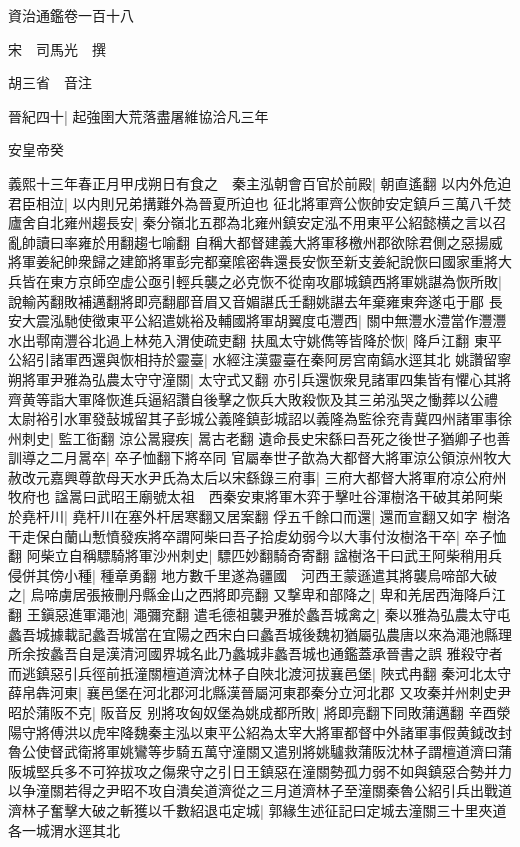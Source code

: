 資治通鑑卷一百十八

宋　司馬光　撰

胡三省　音注

晉紀四十|{
	起強圉大荒落盡屠維協洽凡三年}


安皇帝癸

義熙十三年春正月甲戌朔日有食之　秦主泓朝會百官於前殿|{
	朝直遙翻}
以内外危迫君臣相泣|{
	以内則兄弟搆難外為晉夏所迫也}
征北將軍齊公恢帥安定鎮戶三萬八千焚廬舍自北雍州趨長安|{
	秦分嶺北五郡為北雍州鎮安定泓不用東平公紹懿横之言以召亂帥讀曰率雍於用翻趨七喻翻}
自稱大都督建義大將軍移檄州郡欲除君側之惡揚威將軍姜紀帥衆歸之建節將軍彭完都棄隂密犇還長安恢至新支姜紀說恢曰國家重將大兵皆在東方京師空虚公亟引輕兵襲之必克恢不從南攻郿城鎮西將軍姚諶為恢所敗|{
	說輸芮翻敗補邁翻將即亮翻郿音眉又音媚諶氏壬翻姚諶去年棄雍東奔遂屯于郿}
長安大震泓馳使徵東平公紹遣姚裕及輔國將軍胡翼度屯灃西|{
	關中無灃水澧當作灃灃水出鄠南灃谷北過上林苑入渭使疏吏翻}
扶風太守姚儁等皆降於恢|{
	降戶江翻}
東平公紹引諸軍西還與恢相持於靈臺|{
	水經注漢靈臺在秦阿房宫南鎬水逕其北}
姚讚留寧朔將軍尹雅為弘農太守守潼關|{
	太守式又翻}
亦引兵還恢衆見諸軍四集皆有懼心其將齊黄等詣大軍降恢進兵逼紹讚自後擊之恢兵大敗殺恢及其三弟泓哭之慟葬以公禮　太尉裕引水軍發鼔城留其子彭城公義隆鎮彭城詔以義隆為監徐兖青冀四州諸軍事徐州刺史|{
	監工衘翻}
涼公暠寢疾|{
	暠古老翻}
遺命長史宋繇曰吾死之後世子猶卿子也善訓導之二月暠卒|{
	卒子恤翻下將卒同}
官屬奉世子歆為大都督大將軍涼公領涼州牧大赦改元嘉興尊歆母天水尹氏為太后以宋繇錄三府事|{
	三府大都督大將軍府凉公府州牧府也}
諡暠曰武昭王廟號太祖　西秦安東將軍木弈于擊吐谷渾樹洛干破其弟阿柴於堯杆川|{
	堯杆川在塞外杆居寒翻又居案翻}
俘五千餘口而還|{
	還而宣翻又如字}
樹洛干走保白蘭山慙憤發疾將卒謂阿柴曰吾子拾䖍幼弱今以大事付汝樹洛干卒|{
	卒子恤翻}
阿柴立自稱驃騎將軍沙州刺史|{
	驃匹妙翻騎奇寄翻}
諡樹洛干曰武王阿柴稍用兵侵併其傍小種|{
	種章勇翻}
地方數千里遂為疆國　河西王蒙遜遣其將襲烏啼部大破之|{
	烏啼虜居張掖刪丹縣金山之西將即亮翻}
又撃卑和部降之|{
	卑和羌居西海降戶江翻}
王鎭惡進軍澠池|{
	澠彌兖翻}
遣毛德祖襲尹雅於蠡吾城禽之|{
	秦以雅為弘農太守屯蠡吾城據載記蠡吾城當在宜陽之西宋白曰蠡吾城後魏初猶屬弘農唐以來為澠池縣理所余按蠡吾自是漢清河國界城名此乃蠡城非蠡吾城也通鑑蓋承晉書之誤}
雅殺守者而逃鎮惡引兵徑前扺潼關檀道濟沈林子自陜北渡河拔襄邑堡|{
	陜式冉翻}
秦河北太守薛帛犇河東|{
	襄邑堡在河北郡河北縣漢晉屬河東郡秦分立河北郡}
又攻秦并州刺史尹昭於蒲阪不克|{
	阪音反}
别將攻匈奴堡為姚成都所敗|{
	將即亮翻下同敗蒲邁翻}
辛酉滎陽守將傅洪以虎牢降魏秦主泓以東平公紹為太宰大將軍都督中外諸軍事假黄鉞改封魯公使督武衛將軍姚鸞等步騎五萬守潼關又遣别將姚驢救蒲阪沈林子謂檀道濟曰蒲阪城堅兵多不可猝拔攻之傷衆守之引日王鎮惡在潼關勢孤力弱不如與鎮惡合勢并力以争潼關若得之尹昭不攻自潰矣道濟從之三月道濟林子至潼關秦魯公紹引兵出戰道濟林子奮擊大破之斬獲以千數紹退屯定城|{
	郭緣生述征記曰定城去潼關三十里夾道各一城渭水逕其北}
